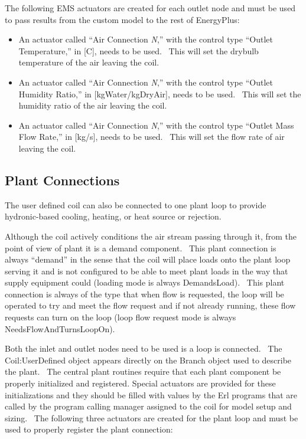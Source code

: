 The following EMS actuators are created for each outlet node and must be used to pass results from the custom model to the rest of EnergyPlus:

\begin{itemize}
\item
  An actuator called ``Air Connection \emph{N},'' with the control type ``Outlet Temperature,'' in {[}C{]}, needs to be used.~ This will set the drybulb temperature of the air leaving the coil.
\item
  An actuator called ``Air Connection \emph{N},'' with the control type ``Outlet Humidity Ratio,'' in {[}kgWater/kgDryAir{]}, needs to be used.~ This will set the humidity ratio of the air leaving the coil.
\item
  An actuator called ``Air Connection \emph{N},'' with the control type ``Outlet Mass Flow Rate,'' in {[}kg/s{]}, needs to be used.~ This will set the flow rate of air leaving the coil.
\end{itemize}

\subsection{Plant Connections}\label{plant-connections}

The user defined coil can also be connected to one plant loop to provide hydronic-based cooling, heating, or heat source or rejection.

Although the coil actively conditions the air stream passing through it, from the point of view of plant it is a demand component.~ This plant connection is always ``demand'' in the sense that the coil will place loads onto the plant loop serving it and is not configured to be able to meet plant loads in the way that supply equipment could (loading mode is always DemandsLoad).~ This plant connection is always of the type that when flow is requested, the loop will be operated to try and meet the flow request and if not already running, these flow requests can turn on the loop (loop flow request mode is always NeedsFlowAndTurnsLoopOn).

Both the inlet and outlet nodes need to be used is a loop is connected.~ The Coil:UserDefined object appears directly on the Branch object used to describe the plant.~ The central plant routines require that each plant component be properly initialized and registered. Special actuators are provided for these initializations and they should be filled with values by the Erl programs that are called by the program calling manager assigned to the coil for model setup and sizing.~ The following three actuators are created for the plant loop and must be used to properly register the plant connection:

